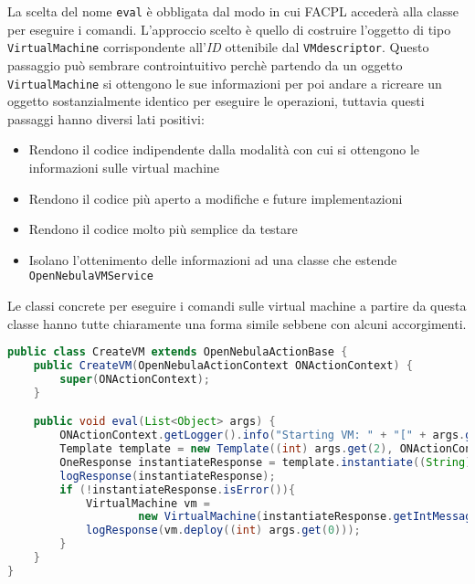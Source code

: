 La scelta del nome \texttt{eval} è obbligata dal modo in cui FACPL accederà alla classe per eseguire i comandi.
L'approccio scelto è quello di costruire l'oggetto di tipo \texttt{VirtualMachine} corrispondente all'\emph{ID} ottenibile dal \texttt{VMdescriptor}. Questo passaggio può sembrare controintuitivo perchè partendo da un oggetto \texttt{VirtualMachine} si ottengono le sue informazioni per poi andare a ricreare un oggetto sostanzialmente identico per eseguire le operazioni, tuttavia questi passaggi hanno diversi lati positivi:
\begin{itemize}
    \item Rendono il codice indipendente dalla modalità con cui si ottengono le informazioni sulle virtual machine
    \item Rendono il codice più aperto a modifiche e future implementazioni
    \item Rendono il codice molto più semplice da testare
    \item Isolano l'ottenimento delle informazioni ad una classe che estende \texttt{OpenNebulaVMService}
\end{itemize}
Le classi concrete per eseguire i comandi sulle virtual machine a partire da questa classe hanno tutte chiaramente una forma simile sebbene con alcuni accorgimenti.
\begin{lstlisting}[language=Java, caption=Classe per avviare una \texttt{VirtualMachine}, label=code:CreateVM, basicstyle=\fontsize{8.5}{9.5}\ttfamily]
public class CreateVM extends OpenNebulaActionBase {
	public CreateVM(OpenNebulaActionContext ONActionContext) {
		super(ONActionContext);
	}

	public void eval(List<Object> args) {
		ONActionContext.getLogger().info("Starting VM: " + "[" + args.get(2) + ", " + args.get(1) + "]");
		Template template = new Template((int) args.get(2), ONActionContext.getClient());
		OneResponse instantiateResponse = template.instantiate((String) args.get(1));
		logResponse(instantiateResponse);
		if (!instantiateResponse.isError()){
			VirtualMachine vm = 
					new VirtualMachine(instantiateResponse.getIntMessage(), ONActionContext.getClient());
			logResponse(vm.deploy((int) args.get(0)));
		}		
	}
}
\end{lstlisting}
